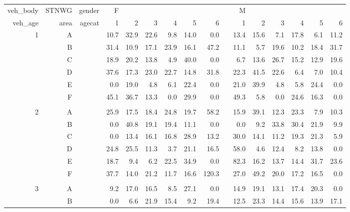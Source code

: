 \documentclass[12pt]{article}
\begin{document}
\begin{sidewaysfigure} %
\begin{center}
\begin{tabular}{rr|rrrrrrrrrrrrrr}
\hline
veh\_body&STNWG& gender & F &&&&&&& M &&&&& \\
veh\_age & area & agecat & 1 & 2 & 3 & 4 & 5 & 6 & & 1 & 2 & 3 & 4 & 5 & 6 \\ \hline \hline
%
1 & A & & 10.7  & 32.9  & 22.6  & 9.8   & 14.0  & 0.0   && 13.4  & 15.6  & 7.1   & 17.8  & 6.1   & 11.2  \\
  & B & & 31.4  & 10.9  & 17.1  & 23.9  & 16.1  & 47.2  && 11.1  & 5.7   & 19.6  & 10.2  & 18.4  & 31.7  \\
  & C & & 18.9  & 20.2  & 13.8  & 4.9   & 40.0  & 0.0   && 6.7   & 13.6  & 26.7  & 15.2  & 12.9  & 19.6  \\
  & D & & 37.6  & 17.3  & 23.0  & 22.7  & 14.8  & 31.8  && 22.3  & 41.5  & 22.6  & 6.4   & 7.0   & 10.4  \\
  & E & & 0.0   & 19.0  & 4.8   & 6.1   & 22.4  & 0.0   && 21.0  & 39.9  & 4.8   & 5.8   & 24.4  & 0.0   \\
  & F & & 45.1  & 36.7  & 13.3  & 0.0   & 29.9  & 0.0   && 49.3  & 5.8   & 0.0   & 24.6  & 16.3  & 0.0   \\ & \\
2 & A & & 25.9  & 17.5  & 18.4  & 24.8  & 19.7  & 58.2  && 15.9  & 39.1  & 12.3  & 23.3  & 7.9   & 10.3  \\
  & B & & 0.0   & 40.8  & 19.1  & 19.4  & 11.1  & 0.0   && 0.0   & 9.2   & 33.8  & 30.4  & 21.9  & 9.9   \\
  & C & & 0.0   & 13.4  & 16.1  & 16.8  & 28.9  & 13.2  && 30.0  & 14.1  & 11.2  & 19.3  & 21.3  & 5.9   \\
  & D & & 24.8  & 25.5  & 11.3  & 3.7   & 21.1  & 16.5  && 58.0  & 4.6   & 12.4  & 8.2   & 13.8  & 0.0   \\
  & E & & 18.7  & 9.4   & 6.2   & 22.5  & 34.9  & 0.0   && 82.3  & 16.2  & 13.7  & 14.4  & 31.7  & 23.6  \\
  & F & & 37.7  & 14.0  & 21.2  & 11.7  & 16.6  & 120.3 && 27.0  & 49.2  & 20.0  & 17.2  & 16.5  & 0.0   \\ & \\
3 & A & & 9.2   & 17.0  & 16.5  & 8.5   & 27.1  & 0.0   && 14.9  & 19.1  & 13.1  & 17.4  & 20.3  & 0.0   \\
  & B & & 0.0   & 6.6   & 21.9  & 15.4  & 9.2   & 19.4  && 12.5  & 23.3  & 14.4  & 15.6  & 13.9  & 17.1  \\

\end{tabular}
\end{center}
\end{sidewaysfigure}
\end{document}
